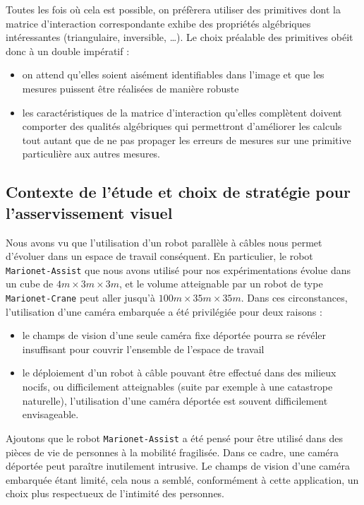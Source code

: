 Toutes les fois où cela est possible, on préfèrera utiliser des primitives dont 
la matrice d'interaction correspondante exhibe des propriétés algébriques 
inté\-ressantes (triangulaire, inversible, \dots). Le choix préalable des 
primitives obéit donc à un double impératif :
\begin{itemize}
 \item on attend qu'elles soient aisément identifiables dans l'image et que les 
mesures puissent être réalisées de manière robuste
 \item les caractéristiques de la matrice d'interaction qu'elles complètent 
doivent comporter des qualités algébriques qui permettront d'améliorer les 
calculs tout autant que de ne pas propager les erreurs de mesures sur une 
primitive particulière aux autres mesures.
\end{itemize}


\subsection{Contexte de l'étude et choix de stratégie pour l'asser\-vissement 
visuel}\label{chap0-3-2}

Nous avons vu que l'utilisation d'un robot parallèle à câbles nous permet 
d'évoluer dans un espace de travail conséquent. En particulier, le robot {\tt 
Marionet-Assist} que nous avons utilisé pour nos expérimentations évolue dans un 
cube de $4m \times 3m \times 3m$, et le volume atteignable par un robot de type 
{\tt Marionet-Crane} peut aller jusqu'à $100m \times 35m \times 35m$. Dans ces 
circonstances, l'utilisation d'une caméra embarquée a été privilégiée pour deux 
raisons :
\begin{itemize}
 \item le champs de vision d'une seule caméra fixe déportée pourra se révéler 
insuffisant pour couvrir l'ensemble de l'espace de travail
 \item le déploiement d'un robot à câble pouvant être effectué dans des milieux 
nocifs, ou difficilement atteignables (suite par exemple à une catastrope 
naturelle), l'utilisation d'une caméra déportée est souvent difficilement 
envisageable.
\end{itemize}

Ajoutons que le robot {\tt Marionet-Assist} a été pensé pour être utilisé dans 
des pièces de vie de personnes à la mobilité fragilisée. Dans ce cadre, une 
caméra déportée peut paraître inutilement intrusive. Le champs de vision d'une 
caméra embarquée étant limité, cela nous a semblé, conformément à cette 
application, un choix plus respectueux de l'intimité des personnes. 

